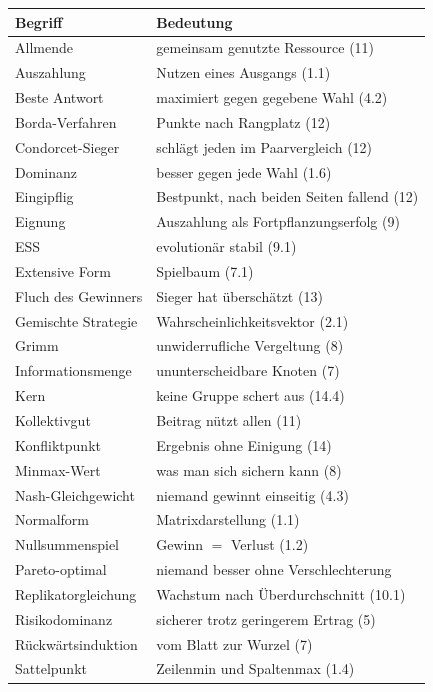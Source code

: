 \begin{merksatz}
\begin{center}
{\small
\renewcommand{\arraystretch}{1.3}
\begin{longtable}{@{}P{3.6cm}P{5.0cm}@{}}
\toprule
\textbf{Begriff} & \textbf{Bedeutung}\\
\midrule
\endhead
Allmende & gemeinsam genutzte Ressource (11)\\
Auszahlung & Nutzen eines Ausgangs (1.1)\\
Beste Antwort & maximiert gegen gegebene Wahl (4.2)\\
Borda-Verfahren & Punkte nach Rangplatz (12)\\
Condorcet-Sieger & schlägt jeden im Paarvergleich (12)\\
Dominanz & besser gegen jede Wahl (1.6)\\
Eingipflig & Bestpunkt, nach beiden Seiten fallend (12)\\
Eignung & Auszahlung als Fortpflanzungserfolg (9)\\
ESS & evolutionär stabil (9.1)\\
Extensive Form & Spielbaum (7.1)\\
Fluch des Gewinners & Sieger hat überschätzt (13)\\
Gemischte Strategie & Wahrscheinlichkeitsvektor (2.1)\\
Grimm & unwiderrufliche Vergeltung (8)\\
Informationsmenge & ununterscheidbare Knoten (7)\\
Kern & keine Gruppe schert aus (14.4)\\
Kollektivgut & Beitrag nützt allen (11)\\
Konfliktpunkt & Ergebnis ohne Einigung (14)\\
Minmax-Wert & was man sich sichern kann (8)\\
Nash-Gleichgewicht & niemand gewinnt einseitig (4.3)\\
Normalform & Matrixdarstellung (1.1)\\
Nullsummenspiel & Gewinn $=$ Verlust (1.2)\\
Pareto-optimal & niemand besser ohne Verschlechterung\\
Replikatorgleichung & Wachstum nach Überdurchschnitt (10.1)\\
Risikodominanz & sicherer trotz geringerem Ertrag (5)\\
Rückwärtsinduktion & vom Blatt zur Wurzel (7)\\
Sattelpunkt & Zeilenmin und Spaltenmax (1.4)\\

\end{longtable}}
\end{center}
\end{merksatz}
